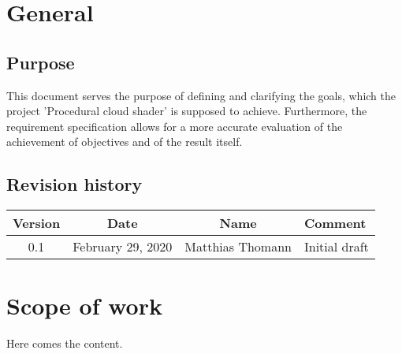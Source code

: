\documentclass[a4paper,11pt]{article}
\begin{document}
\title{\doctitle}
\author{\docauthor}
\date{\versiondate} 

\newcommand{\docsubtitle}{Requirement specification}
\newcommand{\docauthor}{Matthias Thomann}
\newcommand{\doctitle}{Procedural cloud shader}
\newcommand{\fieldofstudies}{BSc in Computer Science}
\newcommand{\specialisation}{Computer perception and virtual reality}
\newcommand{\prof}{Prof. Urs K\"unzler}

\newcommand{\versionnumber}{0.1}
\newcommand{\versiondate}{\today}

\titlespacing*{\section} {0pt}{7.5ex plus 1ex minus .2ex}{2.3ex plus .2ex}
\titlespacing*{\subsection} {0pt}{.25ex plus 1ex minus .2ex}{1.5ex plus .2ex}



\tableofcontents
\clearpage

\section{General}

\subsection{Purpose}
This document serves the purpose of defining and clarifying the goals, which the project 'Procedural cloud shader' is supposed to achieve. Furthermore, the requirement specification allows for a more accurate evaluation of the achievement of objectives and of the result itself.

\subsection{Revision history}

\begin{tabularx}{\textwidth}{|c|c|c|X|}
    \hline
    Version & Date & Name & Comment \\ 
    \hline
    0.1 & February 29, 2020 & Matthias Thomann & Initial draft \\ 
    \hline
\end{tabularx}

\section{Scope of work}
Here comes the content.

\clearpage

\printglossaries

\clearpage
\end{document}
